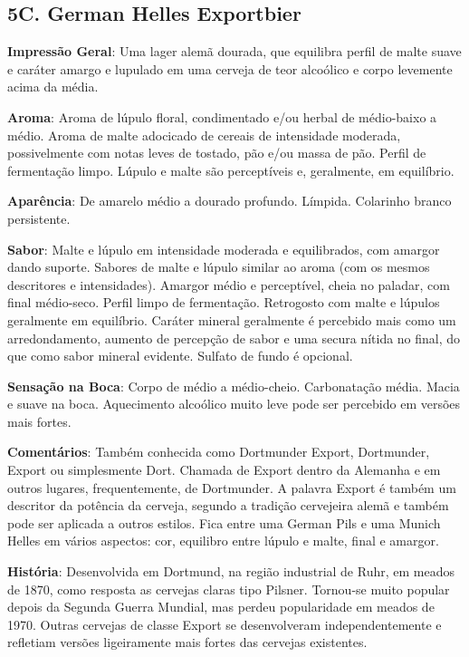 \subsection*{5C. German Helles Exportbier}
\textbf{Impressão Geral}: Uma lager alemã dourada, que equilibra perfil de malte suave e caráter amargo e lupulado em uma cerveja de teor alcoólico e corpo levemente acima da média.

\textbf{Aroma}: Aroma de lúpulo floral, condimentado e/ou herbal de médio-baixo a médio. Aroma de malte adocicado de cereais de intensidade moderada, possivelmente com notas leves de tostado, pão e/ou massa de pão. Perfil de fermentação limpo. Lúpulo e malte são perceptíveis e, geralmente, em equilíbrio.

\textbf{Aparência}: De amarelo médio a dourado profundo. Límpida. Colarinho branco persistente.

\textbf{Sabor}: Malte e lúpulo em intensidade moderada e equilibrados, com amargor dando suporte. Sabores de malte e lúpulo similar ao aroma (com os mesmos descritores e intensidades). Amargor médio e perceptível, cheia no paladar, com final médio-seco. Perfil limpo de fermentação. Retrogosto com malte e lúpulos geralmente em equilíbrio. Caráter mineral geralmente é percebido mais como um arredondamento, aumento de percepção de sabor e uma secura nítida no final, do que como sabor mineral evidente. Sulfato de fundo é opcional.

\textbf{Sensação na Boca}: Corpo de médio a médio-cheio. Carbonatação média. Macia e suave na boca. Aquecimento alcoólico muito leve pode ser percebido em versões mais fortes.

\textbf{Comentários}: Também conhecida como Dortmunder Export, Dortmunder, Export ou simplesmente Dort. Chamada de Export dentro da Alemanha e em outros lugares, frequentemente, de Dortmunder. A palavra Export é também um descritor da potência da cerveja, segundo a tradição cervejeira alemã e também pode ser aplicada a outros estilos. Fica entre uma German Pils e uma Munich Helles em vários aspectos: cor, equilibro entre lúpulo e malte, final e amargor.

\textbf{História}: Desenvolvida em Dortmund, na região industrial de Ruhr, em meados de 1870, como resposta as cervejas claras tipo Pilsner. Tornou-se muito popular depois da Segunda Guerra Mundial, mas perdeu popularidade em meados de 1970. Outras cervejas de classe Export se desenvolveram independentemente e refletiam versões ligeiramente mais fortes das cervejas existentes.

